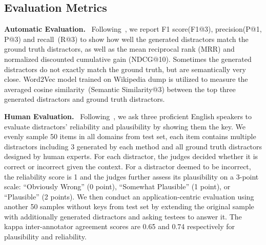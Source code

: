 \subsection{Evaluation Metrics}
\label{sec:metrics}
\textbf{Automatic Evaluation.} ~Following~\cite{liang2018distractor}, we report F1 score(F1@3), 
precision(P@1, P@3) and recall~(R@3) to show how well the generated distractors 
match the ground truth distractors, 
as well as the mean reciprocal rank (MRR) and normalized discounted 
cumulative gain (NDCG@10). Sometimes the generated distractors
do not exactly match the ground truth, but are semantically very close. 
Word2Vec model trained on Wikipedia dump 
is utilized to measure the averaged cosine similarity~(Semantic Similarity@3) between the top three generated 
distractors and ground truth distractors.  

\noindent
\textbf{Human Evaluation.} ~Following~\cite{jiang2017distractor}, we ask three proficient English speakers to evaluate distractors' reliability and plausibility by showing them the key. We evenly sample 50 items in all domains from test set, each item contains multiple distractors including 3 generated by each method and all ground truth distractors 
designed by human experts. For each distractor, the judges decided whether it is correct or incorrect given the context. For a distractor deemed to 
be incorrect, the reliability score is 1 and the judges further assess 
its plausibility on a 3-point scale: 
``Obviously Wrong'' (0 point), 
``Somewhat Plausible'' (1 point), 
or ``Plausible'' (2 points). We then conduct an application-centric evaluation using another 50 samples without keys from test set by extending the original sample with additionally generated distractors and asking testees to answer it. The kappa inter-annotator agreement scores are 0.65 and 0.74 respectively for plausibility and reliability.



